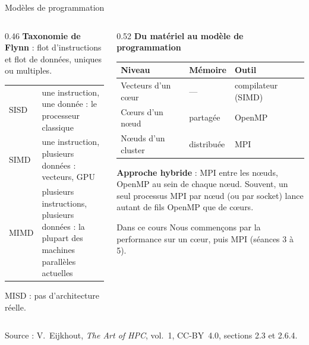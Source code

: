 \documentclass[8pt,aspectratio=169]{beamer}
\newcommand{\src}[1]{\vfill{\tiny\color{gray}Source : #1\par}}
\newcommand{\eij}{V.~Eijkhout, \emph{The Art of HPC}, vol.~1, CC-BY~4.0}
\begin{document}
\begin{frame}{Modèles de programmation}
\begin{columns}[T]
\begin{column}{0.46\textwidth}
\textbf{Taxonomie de Flynn} : flot d'instructions et flot de données, uniques ou multiples.

\smallskip
\begin{tabular}{@{}lp{4.2cm}@{}}
\toprule
SISD & une instruction, une donnée : le processeur classique\\
SIMD & une instruction, plusieurs données : vecteurs, GPU\\
MIMD & plusieurs instructions, plusieurs données : la plupart des machines parallèles actuelles\\
\bottomrule
\end{tabular}

\smallskip
{\scriptsize MISD : pas d'architecture réelle.}
\end{column}
\begin{column}{0.52\textwidth}
\textbf{Du matériel au modèle de programmation}

\smallskip
\begin{tabular}{@{}lll@{}}
\toprule
Niveau & Mémoire & Outil\\
\midrule
Vecteurs d'un cœur & --- & compilateur (SIMD)\\
Cœurs d'un nœud & partagée & OpenMP\\
Nœuds d'un cluster & distribuée & MPI\\
\bottomrule
\end{tabular}

\medskip
\textbf{Approche hybride} : MPI entre les nœuds, OpenMP au sein de chaque nœud. Souvent, un seul processus MPI par nœud (ou par socket) lance autant de fils OpenMP que de cœurs.

\medskip
\begin{exampleblock}{Dans ce cours}
Nous commençons par la performance sur un cœur, puis MPI (séances 3 à 5).
\end{exampleblock}
\end{column}
\end{columns}
\src{\eij{}, sections 2.3 et 2.6.4.}
\end{frame}
\end{document}
